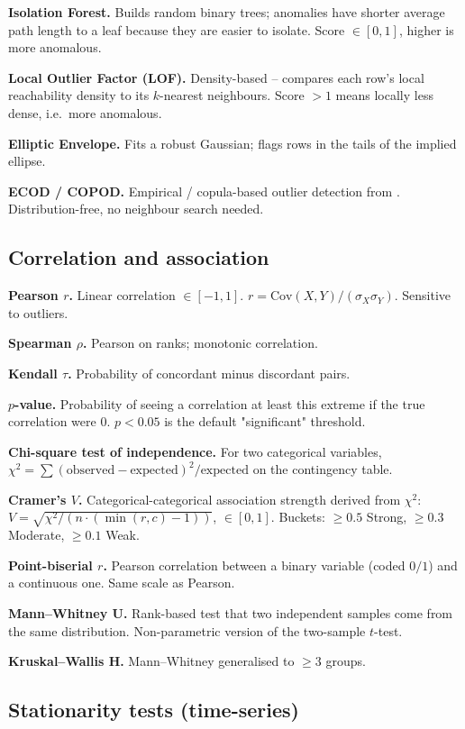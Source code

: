 \documentclass[11pt,a4paper]{article}
\newcommand{\code}[1]{\texttt{\detokenize{#1}}}
\begin{document}
\textbf{Isolation Forest.} Builds random binary trees; anomalies have
shorter average path length to a leaf because they are easier to isolate.
Score $\in [0, 1]$, higher is more anomalous.

\textbf{Local Outlier Factor (LOF).} Density-based -- compares each row's
local reachability density to its $k$-nearest neighbours. Score $> 1$ means
locally less dense, i.e.\ more anomalous.

\textbf{Elliptic Envelope.} Fits a robust Gaussian; flags rows in the tails
of the implied ellipse.

\textbf{ECOD / COPOD.} Empirical / copula-based outlier detection from
\code{pyod}. Distribution-free, no neighbour search needed.

\subsection{Correlation and association}

\textbf{Pearson $r$.} Linear correlation $\in [-1, 1]$.
$r = \mathrm{Cov}(X, Y) / (\sigma_X \sigma_Y)$. Sensitive to outliers.

\textbf{Spearman $\rho$.} Pearson on ranks; monotonic correlation.

\textbf{Kendall $\tau$.} Probability of concordant minus discordant pairs.

\textbf{$p$-value.} Probability of seeing a correlation at least this
extreme if the true correlation were $0$. $p < 0.05$ is the default
"significant" threshold.

\textbf{Chi-square test of independence.} For two categorical variables,
$\chi^2 = \sum (\mathrm{observed} - \mathrm{expected})^2 / \mathrm{expected}$
on the contingency table.

\textbf{Cramer's $V$.} Categorical-categorical association strength derived
from $\chi^2$:
$V = \sqrt{\chi^2 / (n \cdot (\min(r,c) - 1))}$, $\in [0, 1]$.
Buckets: $\geq 0.5$ Strong, $\geq 0.3$ Moderate, $\geq 0.1$ Weak.

\textbf{Point-biserial $r$.} Pearson correlation between a binary variable
(coded $0/1$) and a continuous one. Same scale as Pearson.

\textbf{Mann--Whitney U.} Rank-based test that two independent samples come
from the same distribution. Non-parametric version of the two-sample
$t$-test.

\textbf{Kruskal--Wallis H.} Mann--Whitney generalised to $\geq 3$ groups.

\subsection{Stationarity tests (time-series)}
\end{document}
